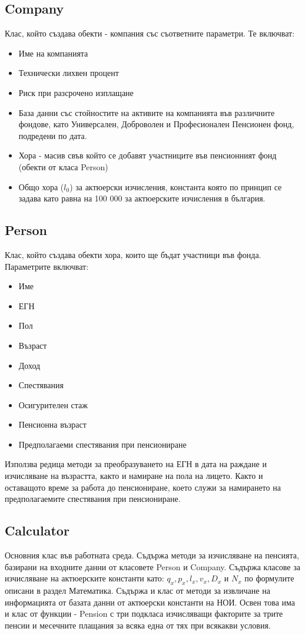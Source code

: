 \documentclass[a4paper,12pt]{article}
\begin{document}
\subsection{Company}
Клас, който създава обекти - компания със съответните параметри. Те включват:
\begin{itemize}
        \item Име на компанията
        \item Технически лихвен процент
        \item Риск при разсрочено изплащане
        \item База данни със стойностите на активите на компанията във различните фондове, като Универсален, Доброволен и Професионален Пенсионен фонд, подредени по дата.
        \item Хора - масив свъв който се добавят участниците във пенсионният фонд (обекти от класа Person)
        \item Общо хора ($l_0$) за актюерски изчисления, константа която по принцип се задава като равна на 100 000 за актюерските изчисления в българия.
\end{itemize}

\subsection{Person}
Клас, който създава обекти хора, които ще бъдат участници във фонда. Параметрите включват:
\begin{itemize}
        \item Име
        \item ЕГН
        \item Пол
        \item Възраст
        \item Доход
        \item Спестявания
        \item Осигурителен стаж
        \item Пенсионна възраст
        \item Предполагаеми спестявания при пенсиониране
\end{itemize}
Използва редица методи за преобразуването на ЕГН в дата на раждане и изчисляване на възрастта, както и намиране на пола на лицето. Както и оставащото време за работа до пенсиониране, което служи за намирането на предполагаемите спестявания при пенсиониране.
\subsection{Calculator}
Основния клас във работната среда. Съдържа методи за изчисляване на пенсията, базирани на входните данни от класовете Person и Company.
\newline
Съдържа класове за изчисляване на актюерските константи като: $q_x, p_x, l_x, v_x, D_x$ и $N_x$ по формулите описани в раздел Математика. Съдържа и клас от методи за извличане на информацията от базата данни от актюерски константи на НОИ. Освен това има и клас от функции - Pension с три подкласа изчисляващи факторите за трите пенсии и месечните плащания за всяка една от тях при всякакви условия.
\end{document}
